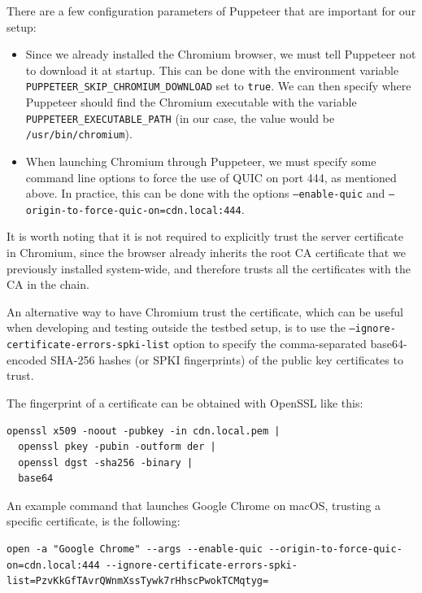 There are a few configuration parameters of Puppeteer that are important for our setup:

\begin{itemize}
    \item Since we already installed the Chromium browser, we must tell Puppeteer not to download it at startup. This can be done with the environment variable \texttt{PUPPETEER\_SKIP\_CHROMIUM\_DOWNLOAD} set to \texttt{true}. We can then specify where Puppeteer should find the Chromium executable with the variable \texttt{PUPPETEER\_EXECUTABLE\_PATH} (in our case, the value would be \texttt{/usr/bin/chromium}).
    \item When launching Chromium through Puppeteer, we must specify some command line options to force the use of QUIC on port 444, as mentioned above. In practice, this can be done with the options \texttt{--enable-quic} and \texttt{--origin-to-force-quic-on=cdn.local:444}.
\end{itemize}

It is worth noting that it is not required to explicitly trust the server certificate in Chromium, since the browser already inherits the root CA certificate that we previously installed system-wide, and therefore trusts all the certificates with the CA in the chain.

An alternative way to have Chromium trust the certificate, which can be useful when developing and testing outside the testbed setup, is to use the \texttt{--ignore-certificate-errors-spki-list} option to specify the comma-separated base64-encoded SHA-256 hashes (or SPKI fingerprints) of the public key certificates to trust.

The fingerprint of a certificate can be obtained with OpenSSL like this:

\begin{verbatim}
openssl x509 -noout -pubkey -in cdn.local.pem |
  openssl pkey -pubin -outform der |
  openssl dgst -sha256 -binary |
  base64
\end{verbatim}

An example command that launches Google Chrome on macOS, trusting a specific certificate, is the following:

\begin{verbatim}
open -a "Google Chrome" --args --enable-quic --origin-to-force-quic-on=cdn.local:444 --ignore-certificate-errors-spki-list=PzvKkGfTAvrQWnmXssTywk7rHhscPwokTCMqtyg=
\end{verbatim}

